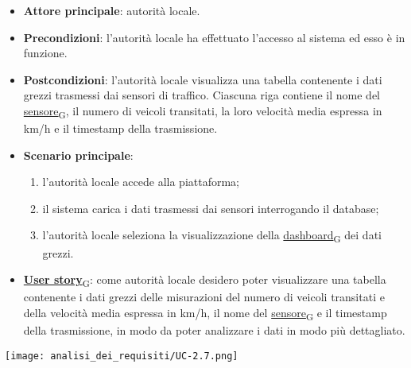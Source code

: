\begin{itemize}
	\item \textbf{Attore principale}: autorità locale.
	\item \textbf{Precondizioni}: l'autorità locale ha effettuato l'accesso al sistema ed esso è in funzione.
	\item \textbf{Postcondizioni}: l'autorità locale visualizza una tabella contenente i dati grezzi trasmessi dai sensori di traffico.
	      Ciascuna riga contiene il nome del \href{https://7last.github.io/docs/pb/documentazione-interna/glossario\#sensore}{sensore\textsubscript{G}}, il numero di veicoli transitati, la loro velocità media espressa in km/h e il timestamp della trasmissione.
	\item \textbf{Scenario principale}:
	      \begin{enumerate}
		      \item l'autorità locale accede alla piattaforma;
		      \item il sistema carica i dati trasmessi dai sensori interrogando il database;
		      \item l'autorità locale seleziona la visualizzazione della \href{https://7last.github.io/docs/pb/documentazione-interna/glossario\#dashboard}{dashboard\textsubscript{G}} dei dati grezzi.
	      \end{enumerate}
	\item \href{https://7last.github.io/docs/pb/documentazione-interna/glossario\#user-story}{\textbf{User story}\textsubscript{G}}:
	      come autorità locale desidero poter visualizzare una tabella contenente i dati grezzi delle misurazioni del numero di veicoli transitati
	      e della velocità media espressa in km/h, il nome del \href{https://7last.github.io/docs/pb/documentazione-interna/glossario\#sensore}{sensore\textsubscript{G}} e il timestamp della trasmissione, in modo da poter analizzare i dati in modo più dettagliato.
\end{itemize}
\begin{center}
	\texttt{[image: analisi\_dei\_requisiti/UC-2.7.png]}
\end{center}

